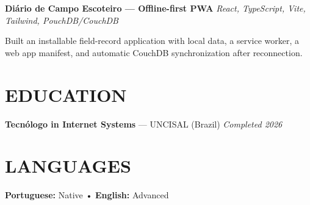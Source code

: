 \documentclass[10pt,a4paper]{article}
\begin{document}
\vspace{0.5pt}

\noindent
\textbf{Diário de Campo Escoteiro — Offline-first PWA}
\hfill
\textit{React, TypeScript, Vite, Tailwind, PouchDB/CouchDB}

\footnotesize

Built an installable field-record application with local data, a service worker, a web app manifest, and automatic CouchDB synchronization after reconnection.

\section*{EDUCATION}

\noindent
\textbf{Tecnólogo in Internet Systems} — UNCISAL (Brazil)
\hfill
\textit{Completed 2026}


\section*{LANGUAGES}

\noindent
\textbf{Portuguese:} Native
\quad • \quad
\textbf{English:} Advanced
\end{document}
